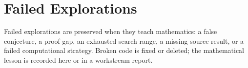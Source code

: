 \section{Failed Explorations}

Failed explorations are preserved when they teach mathematics: a false conjecture, a
proof gap, an exhausted search range, a missing-source result, or a failed
computational strategy. Broken code is fixed or deleted; the mathematical lesson is
recorded here or in a workstream report.

\begin{claimledger}
\end{claimledger}
